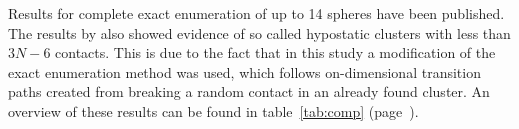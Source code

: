 Results for complete exact enumeration of up to 14
spheres\autocite{Arkus_DerivingFiniteSphere_2011,Hoy_Structurefinitesphere_2012,Hoy_Structuredynamicsmodel_2015,Holmes-Cerfon_EnumeratingRigidSphere_2016}
have been published. The results by
\citeauthor{Holmes-Cerfon_EnumeratingRigidSphere_2016}\autocite{Holmes-Cerfon_EnumeratingRigidSphere_2016}
also showed evidence of so called hypostatic clusters with less than $3N-6$
contacts. This is due to the fact that in this study a modification of the exact
enumeration method was used, which follows on-dimensional transition paths
created from breaking a random contact in an already found cluster. An overview
of these results can be found in table~\ref{tab:comp} (page~\pageref{tab:comp}).
